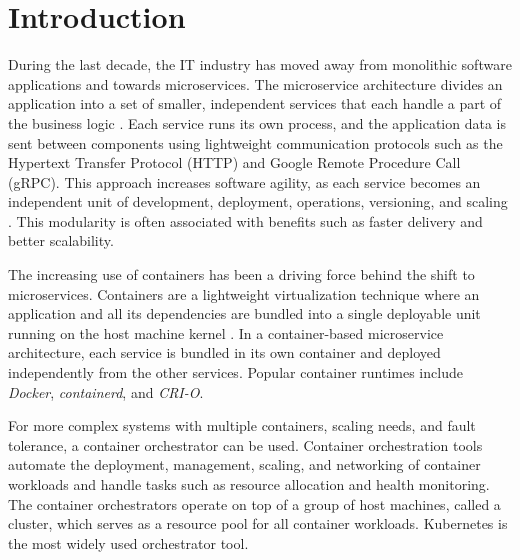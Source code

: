 \documentclass[english, 12pt, a4paper, sci, utf8, a-2b, online]{aaltothesis}
\begin{document}
\cleardoublepage

\section{Introduction} \label{sec:intro}

\thispagestyle{empty}

During the last decade, the IT industry has moved away from monolithic software applications and towards microservices.
The microservice architecture divides an application into a set of smaller, independent services that each handle a part of the business logic \cite{fowler2014microservices}.
Each service runs its own process, and the application data is sent between components using lightweight communication protocols such as the Hypertext Transfer Protocol (HTTP) and Google Remote Procedure Call (gRPC).
This approach increases software agility, as each service becomes an independent unit of development, deployment, operations, versioning, and scaling \cite{jamshidi2018microservices}.
This modularity is often associated with benefits such as faster delivery and better scalability.

The increasing use of containers has been a driving force behind the shift to microservices.
Containers are a lightweight virtualization technique where an application and all its dependencies are bundled into a single deployable unit running on the host machine kernel \cite{bui2015analysis}.
In a container-based microservice architecture, each service is bundled in its own container and deployed independently from the other services.
Popular container runtimes include \emph{Docker}, \emph{containerd}, and \emph{CRI-O}.

For more complex systems with multiple containers, scaling needs, and fault tolerance, a container orchestrator can be used.
Container orchestration tools automate the deployment, management, scaling, and networking of container workloads and handle tasks such as resource allocation and health monitoring.
The container orchestrators operate on top of a group of host machines, called a cluster, which serves as a resource pool for all container workloads.
Kubernetes is the most widely used orchestrator tool.
\end{document}
